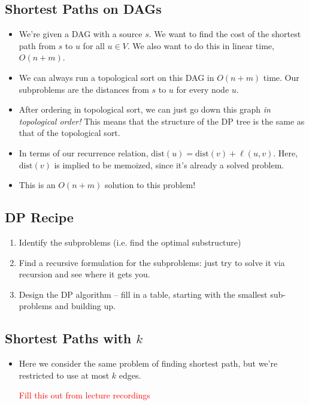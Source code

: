 \documentclass[10pt]{article}
\newcommand{\dist}{\mathrm{dist}}
\newcommand{\question}[1]{\textcolor{red}{#1}}
\begin{document}
	\subsection{Shortest Paths on DAGs}
	\begin{itemize}
		\item We're given a DAG with a source $s$. We want to find the cost of the shortest path from 
			$s$ to $u$ for all $u \in V$. We also want to do this in linear time, 
			$O(n + m)$.
		\item We can always run a topological sort on this DAG in $O(n + m)$ time. Our subproblems 
			are the distances from $s$ to $u$ for every node $u$.
		\item After ordering in topological sort, we can just go down this graph \textit{in topological 
			order!} This means that the structure of the DP tree is the same as that of the topological sort.
		\item In terms of our recurrence relation, $\dist(u) = \dist(v) + \ell(u, v)$. Here, 
			$\dist(v)$ is implied to be memoized, since it's already a solved problem.
		\item This is an $O(n +m)$ solution to this problem!
	\end{itemize}
	\subsection{DP Recipe}
	\begin{enumerate}[label=\alph*)]
		\item Identify the subproblems (i.e. find the optimal substructure)
		\item Find a recursive formulation for the subproblems: just try to solve it via recursion and 
			see where it gets you.
		\item Design the DP algorithm -- fill in a table, starting with the smallest sub-problems and 
			building up. 
	\end{enumerate}
	\subsection{Shortest Paths with $k$}
	\begin{itemize}
		\item Here we consider the same problem of finding shortest path, but we're restricted to use at most 
			$k$ edges. 

			\question{Fill this out from lecture recordings}
	\end{itemize}
\end{document}
